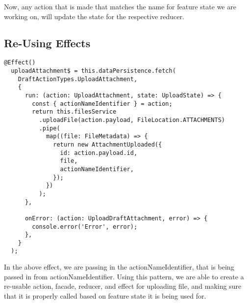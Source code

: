 Now, any action that is made that matches the name for feature state we are
working on, will update the state for the respective reducer.

\subsection{Re-Using Effects}
\begin{lstlisting}
@Effect()
  uploadAttachment$ = this.dataPersistence.fetch(
    DraftActionTypes.UploadAttachment,
    {
      run: (action: UploadAttachment, state: UploadState) => {
        const { actionNameIdentifier } = action;
        return this.filesService
          .uploadFile(action.payload, FileLocation.ATTACHMENTS)
          .pipe(
            map((file: FileMetadata) => {
              return new AttachmentUploaded({
                id: action.payload.id,
                file,
                actionNameIdentifier,
              });
            })
          );
      },

      onError: (action: UploadDraftAttachment, error) => {
        console.error('Error', error);
      },
    }
  );
\end{lstlisting}

In the above effect, we are passing in the actionNameIdentifier, that is being
passed in from actionNameIdentifier. Using this pattern, we are able to create a
re-usable action, facade, reducer, and effect for uploading file, and making
sure that it is properly called based on feature state it is being used for.
